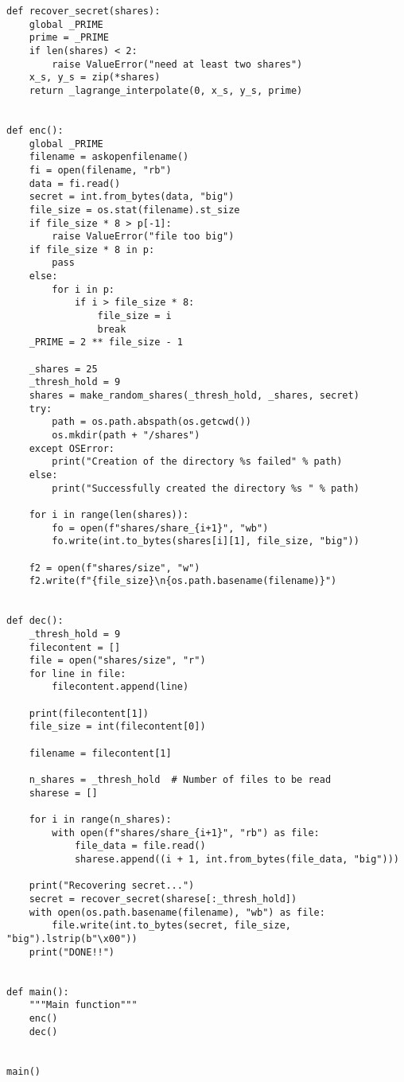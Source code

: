 \documentclass[fleqn,12pt,a4paper]{article}
\begin{document}
\begin{verbatim}
def recover_secret(shares):
    global _PRIME
    prime = _PRIME
    if len(shares) < 2:
        raise ValueError("need at least two shares")
    x_s, y_s = zip(*shares)
    return _lagrange_interpolate(0, x_s, y_s, prime)


def enc():
    global _PRIME
    filename = askopenfilename()
    fi = open(filename, "rb")
    data = fi.read()
    secret = int.from_bytes(data, "big")
    file_size = os.stat(filename).st_size
    if file_size * 8 > p[-1]:
        raise ValueError("file too big")
    if file_size * 8 in p:
        pass
    else:
        for i in p:
            if i > file_size * 8:
                file_size = i
                break
    _PRIME = 2 ** file_size - 1

    _shares = 25
    _thresh_hold = 9
    shares = make_random_shares(_thresh_hold, _shares, secret)
    try:
        path = os.path.abspath(os.getcwd())
        os.mkdir(path + "/shares")
    except OSError:
        print("Creation of the directory %s failed" % path)
    else:
        print("Successfully created the directory %s " % path)

    for i in range(len(shares)):
        fo = open(f"shares/share_{i+1}", "wb")
        fo.write(int.to_bytes(shares[i][1], file_size, "big"))

    f2 = open(f"shares/size", "w")
    f2.write(f"{file_size}\n{os.path.basename(filename)}")


def dec():
    _thresh_hold = 9
    filecontent = []
    file = open("shares/size", "r")
    for line in file:
        filecontent.append(line)

    print(filecontent[1])
    file_size = int(filecontent[0])

    filename = filecontent[1]

    n_shares = _thresh_hold  # Number of files to be read
    sharese = []

    for i in range(n_shares):
        with open(f"shares/share_{i+1}", "rb") as file:
            file_data = file.read()
            sharese.append((i + 1, int.from_bytes(file_data, "big")))

    print("Recovering secret...")
    secret = recover_secret(sharese[:_thresh_hold])
    with open(os.path.basename(filename), "wb") as file:
        file.write(int.to_bytes(secret, file_size, "big").lstrip(b"\x00"))
    print("DONE!!")


def main():
    """Main function"""
    enc()
    dec()


main()

\end{verbatim}
\end{document}
